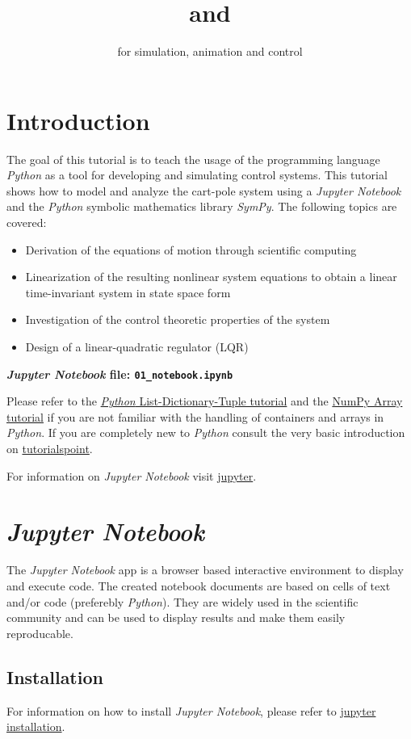 \documentclass[a4paper,11pt,headings=standardclasses,parskip=half]{scrartcl}
\title{\jp and \sympy}
\subtitle{\py for simulation, animation and control}%
\author{}
\date{}
\newcommand{\py}{\emph{Python}\xspace}
\newcommand{\jp}{\emph{Jupyter Notebook}\xspace}
\newcommand{\sympy}{\emph{SymPy}\xspace}
\begin{document}
\maketitle%

\tableofcontents

\newpage

\section{Introduction}
The goal of this tutorial is to teach the usage of the programming language \py as a tool for developing and simulating control systems. This tutorial shows how to model and analyze the cart-pole system using a \jp and the \py symbolic mathematics library \sympy.  The following topics are covered:
\begin{itemize}
\item Derivation of the equations of motion through scientific computing
\item Linearization of the resulting nonlinear system equations to obtain a linear time-invariant system in state space form
\item Investigation of the control theoretic properties of the system
\item Design of a linear-quadratic regulator (LQR)
\end{itemize}
\textbf{\emph{Jupyter Notebook} file: \texttt{01\_notebook.ipynb}}

Please refer to the \href{http://cs231n.github.io/python-numpy-tutorial/#python-containers}{\py List-Dictionary-Tuple tutorial} and the \href{http://cs231n.github.io/python-numpy-tutorial/#numpy}{NumPy Array tutorial} if you are not familiar with the handling of containers and arrays in \py. If you are completely new to \py consult the very basic introduction on \href{https://www.tutorialspoint.com/python/index.htm}{tutorialspoint}.

For information on \jp visit \href{https://jupyter.org}{jupyter}. 
\section{\jp}
The \jp app is a browser based interactive environment to display and execute code. The created notebook documents are based on cells of text and/or code (preferebly \py). They are widely used in the scientific community and can be used to display results and make them easily reproducable.
\subsection{Installation}
For information on how to install \jp, please refer to \href{https://jupyter.readthedocs.io/en/latest/install.html}{jupyter installation}. 
\end{document}
